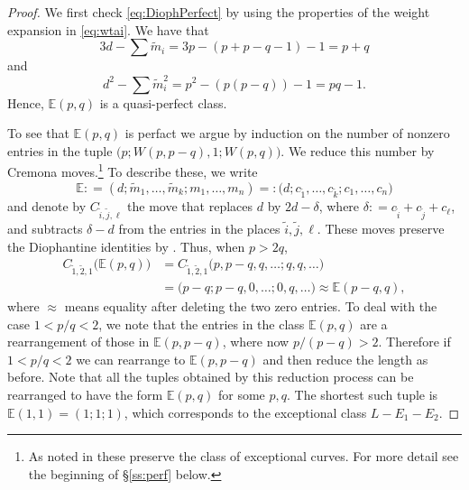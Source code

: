 \documentclass[11pt, reqno]{amsart}
\theoremstyle{remark}
\numberwithin{equation}{subsection}
\numberwithin{figure}{section}
\theoremstyle{customremark}
\newcommand{\Tm}{{\widetilde m}}
\newcommand{\bE}{{\mathbb E}}
\newcommand{\de}{{\delta}}
\begin{document}
    \begin{proof} We first check \eqref{eq:DiophPerfect} by using the properties of the weight expansion in \eqref{eq:wtai}. We have that 
    \[ 3d-\sum \Tm_i=3p-(p+p-q-1)-1=p+q\] 
    and 
    \[ d^2-\sum \Tm_i^2=p^2-(p(p-q))-1=pq-1.\]
    Hence, $\bE(p,q)$ is a quasi-perfect class. 
    
    To see that
    $\bE(p,q)$ is perfact  we argue by induction on the number of nonzero entries in the tuple
    $\bigl(p;W(p,p-q),1;W(p,q)\bigr)$.
      We reduce this number by Cremona moves.\footnote
      {
  As noted in \cite{ball} these preserve the class of exceptional curves. For more detail see the beginning of \S\ref{ss:perf}  below.}
    To describe these, we write
    $$
    \bE: = (d;\Tm_1,\dots, \Tm_k; m_1,\dots, m_n) = :\bigl(d; c_{\tilde{1}},\dots, c_{\tilde{k}}; c_1,\dots,c_n\bigr)
    $$
    and denote by $C_{{\tilde i}, {\tilde j}, \ell}$ the move that replaces $d$ by $2d-\de$, where $\de: = c_{\tilde i} + c_{\tilde j} + c_\ell$, and subtracts $\de - d$ from
    the entries in the places  ${\tilde i}, {\tilde j}, \ell$.  These moves preserve the Diophantine identities by \cite[Prop 1.2.12]{ball}.
    Thus, when $p>2q$,
\begin{align*}
C_{{\tilde 1}, {\tilde 2}, 1}\bigl( \bE(p,q)\bigr) & = C_{{\tilde 1}, {\tilde 2}, 1}\bigl(p,p-q,q,\dots; q,q,\dots\bigr)\\
&
 = \bigl(p-q; p-q,0,\dots; 0,q, \dots \bigr) \approx   \bE(p-q,q),
 \end{align*}
 where  $ \approx $ means equality after deleting the two zero entries.
 To deal with the case $1<p/q < 2$, we note that the entries in the
 class $\bE(p,q)$ are a rearrangement of those in $\bE(p,p-q)$, where now $p/(p-q) > 2$.  Therefore if $1<p/q < 2$ we can rearrange to $\bE(p,p-q)$ and then reduce the length  
 as before.  Note that  all the  tuples obtained by this reduction process can be rearranged to have the form $  \bE(p,q)$ for some $p,q$. The shortest such tuple is $\bE(1,1) = (1;1;1)$, which corresponds to the exceptional class $L - E_1 - E_2$.
\end{proof}
\end{document}
